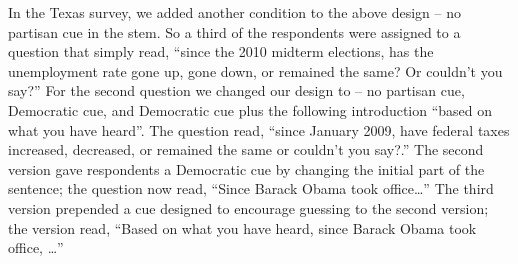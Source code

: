 \documentclass[12pt, letterpaper]{article}
\begin{document}
In the Texas survey, we added another condition to the above design – no partisan cue in the stem. So a third of the respondents were assigned to a question that simply read, ``since the 2010 midterm elections, has the unemployment rate gone up, gone down, or remained the same?  Or couldn’t you say?'' For the second question we changed our design to – no partisan cue, Democratic cue, and Democratic cue plus the following introduction “based on what you have heard”. The question read, ``since January 2009, have federal taxes increased, decreased, or remained the same or couldn’t you say?.'' The second version gave respondents a Democratic cue by changing the initial part of the sentence; the question now read, “Since Barack Obama took office\ldots''  The third version prepended a cue designed to encourage guessing to the second version; the version read, “Based on what you have heard, since Barack Obama took office, \ldots''
\end{document}
